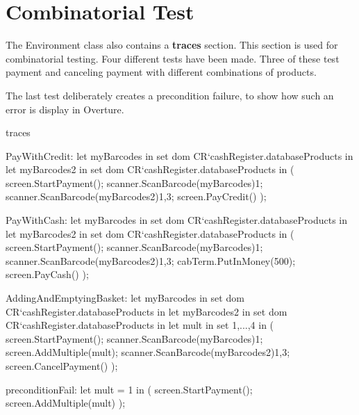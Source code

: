 \section{Combinatorial Test}
The Environment class also contains a \textbf{traces} section. This section is used for combinatorial testing. Four different tests have been made. Three of these test payment and canceling payment with different combinations of products. 

The last test deliberately creates a precondition failure, to show how such an error is display in Overture. 

\begin{vdmpp}

traces

PayWithCredit: 
 let myBarcodes in set dom CR`cashRegister.databaseProducts
 in
  let myBarcodes2 in set dom CR`cashRegister.databaseProducts
  in
  (
   screen.StartPayment();
   scanner.ScanBarcode(myBarcodes){1};
   scanner.ScanBarcode(myBarcodes2){1,3};
   screen.PayCredit()
  );


PayWithCash: 
 let myBarcodes in set dom CR`cashRegister.databaseProducts
 in
  let myBarcodes2 in set dom CR`cashRegister.databaseProducts
  in
  (
   screen.StartPayment();
   scanner.ScanBarcode(myBarcodes){1};
   scanner.ScanBarcode(myBarcodes2){1,3};
   cabTerm.PutInMoney(500);
   screen.PayCash()
  );
       
AddingAndEmptyingBasket: 
 let myBarcodes in set dom CR`cashRegister.databaseProducts
 in
  let myBarcodes2 in set dom CR`cashRegister.databaseProducts
  in
   let mult in set {1,...,4}
   in
   (
    screen.StartPayment();
    scanner.ScanBarcode(myBarcodes){1};
    screen.AddMultiple(mult);
    scanner.ScanBarcode(myBarcodes2){1,3};
    screen.CancelPayment()
   );
   
preconditionFail:
 let mult = 1
  in
  (
   screen.StartPayment();
   screen.AddMultiple(mult)
  );
\end{vdmpp}

